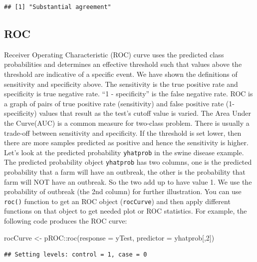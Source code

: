 \documentclass[
  12pt,
]{krantz}
\makeatletter
\newenvironment{Shaded}{\begin{snugshade}}{\end{snugshade}}
\newcommand{\AttributeTok}[1]{\textcolor[rgb]{0.61,0.61,0.61}{#1}}
\newcommand{\DecValTok}[1]{\textcolor[rgb]{0.06,0.06,0.06}{#1}}
\newcommand{\FunctionTok}[1]{\textcolor[rgb]{0,0,0}{#1}}
\newcommand{\NormalTok}[1]{#1}
\newcommand{\OtherTok}[1]{\textcolor[rgb]{0.37,0.37,0.37}{#1}}
\newcommand{\SpecialCharTok}[1]{\textcolor[rgb]{0,0,0}{#1}}
\newenvironment{kframe}{%
\medskip{}
\setlength{\fboxsep}{.8em}
 \def\at@end@of@kframe{}%
 \ifinner\ifhmode%
  \def\at@end@of@kframe{\end{minipage}}%
  \begin{minipage}{\columnwidth}%
 \fi\fi%
 \def\FrameCommand##1{\hskip\@totalleftmargin \hskip-\fboxsep
 \colorbox{shadecolor}{##1}\hskip-\fboxsep
     \hskip-\linewidth \hskip-\@totalleftmargin \hskip\columnwidth}%
 \MakeFramed {\advance\hsize-\width
   \@totalleftmargin\z@ \linewidth\hsize
   \@setminipage}}%
 {\par\unskip\endMakeFramed%
 \at@end@of@kframe}
\renewenvironment{Shaded}{\begin{kframe}}{\end{kframe}}
\makeatother
\begin{document}
\begin{verbatim}
## [1] "Substantial agreement"
\end{verbatim}

\hypertarget{roc}{%
\subsection{ROC}\label{roc}}

Receiver Operating Characteristic (ROC) curve uses the predicted class probabilities and determines an effective threshold such that values above the threshold are indicative of a specific event. We have shown the definitions of sensitivity and specificity above. The sensitivity is the true positive rate and specificity is true negative rate. ``1 - specificity'' is the false negative rate. ROC is a graph of pairs of true positive rate (sensitivity) and false positive rate (1-specificity) values that result as the test's cutoff value is varied. The Area Under the Curve(AUC) is a common measure for two-class problem. There is usually a trade-off between sensitivity and specificity. If the threshold is set lower, then there are more samples predicted as positive and hence the sensitivity is higher. Let's look at the predicted probability \texttt{yhatprob} in the swine disease example. The predicted probability object \texttt{yhatprob} has two columns, one is the predicted probability that a farm will have an outbreak, the other is the probability that farm will NOT have an outbreak. So the two add up to have value 1. We use the probability of outbreak (the 2nd column) for further illustration. You can use \texttt{roc()} function to get an ROC object (\texttt{rocCurve}) and then apply different functions on that object to get needed plot or ROC statistics. For example, the following code produces the ROC curve:

\begin{Shaded}
\begin{Highlighting}[]
\NormalTok{rocCurve }\OtherTok{\textless{}{-}}\NormalTok{ pROC}\SpecialCharTok{::}\FunctionTok{roc}\NormalTok{(}\AttributeTok{response =}\NormalTok{ yTest,}
              \AttributeTok{predictor =}\NormalTok{ yhatprob[,}\DecValTok{2}\NormalTok{])}
\end{Highlighting}
\end{Shaded}

\begin{verbatim}
## Setting levels: control = 1, case = 0
\end{verbatim}
\end{document}

